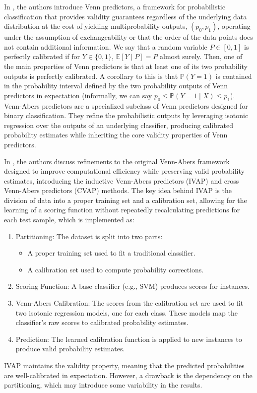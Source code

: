 \documentclass[12pt,twoside]{report}
\begin{document}
In \citep{vovk_2014}, the authors introduce Venn predictors, a framework for probabilistic classification that provides validity guarantees regardless of the underlying data distribution at the cost of yielding multiprobability outputs, $(p_0, p_1)$, operating under the assumption of exchangeability or that the order of the data points does not contain additional information. We say that a random variable $P \in [0, 1]$ is perfectly calibrated if for $Y \in \{0, 1\}$, $\mathbb{E}[Y \mid P] = P$ almost surely. Then, one of the main properties of Venn predictors is that at least one of its two probability outputs is perfectly calibrated. A corollary to this is that $\mathbb{P}(Y = 1)$ is contained in the probability interval defined by the two probability outputs of Venn predictors in expectation (informally, we can say $p_0 \leq \mathbb{P}(Y = 1 \mid X) \leq p_1$). Venn-Abers predictors are a specialized subclass of Venn predictors designed for binary classification. They refine the probabilistic outputs by leveraging isotonic regression over the outputs of an underlying classifier, producing calibrated probability estimates while inheriting the core validity properties of Venn predictors.

In \citep{vovk_2015}, the authors discuss refinements to the original Venn-Abers framework designed to improve computational efficiency while preserving valid probability estimates, introducing the inductive Venn-Abers predictors (IVAP) and cross Venn-Abers predictors (CVAP) methods. The key idea behind IVAP is the division of data into a proper training set and a calibration set, allowing for the learning of a scoring function without repeatedly recalculating predictions for each test sample, which is implemented as:
\begin{enumerate}
    \item Partitioning: The dataset is split into two parts:
    \begin{itemize}
        \item A proper training set used to fit a traditional classifier.
        \item A calibration set used to compute probability corrections.
    \end{itemize}

    \item Scoring Function: A base classifier (e.g., SVM) produces scores for instances.

    \item Venn-Abers Calibration: The scores from the calibration set are used to fit two isotonic regression models, one for each class. These models map the classifier’s raw scores to calibrated probability estimates.

    \item Prediction: The learned calibration function is applied to new instances to produce valid probability estimates.
\end{enumerate}
IVAP maintains the validity property, meaning that the predicted probabilities are well-calibrated in expectation. However, a drawback is the dependency on the partitioning, which may introduce some variability in the results.
\end{document}
